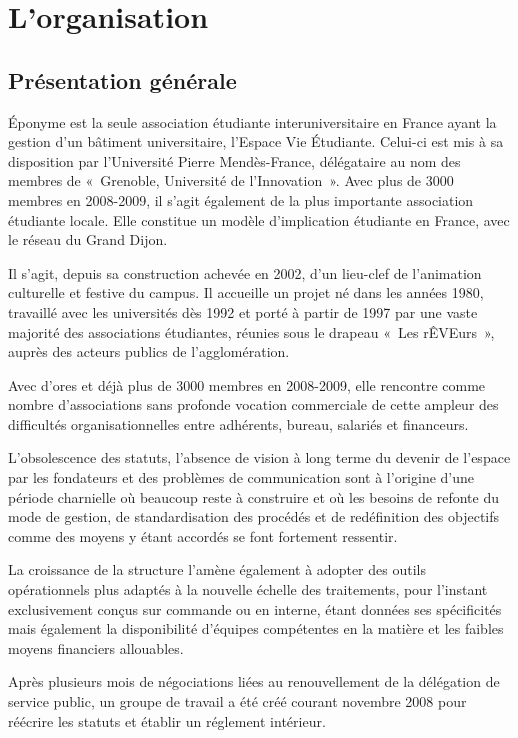 \section{L'organisation}

\subsection{Présentation générale}
\label{presentation}

Éponyme est la seule association étudiante interuniversitaire en France
ayant la gestion d'un bâtiment universitaire, l'Espace Vie Étudiante.
Celui-ci est mis à sa disposition par l'Université Pierre Mendès-France,
délégataire au nom des membres de «~Grenoble, Université de l'Innovation~».
Avec plus de 3000 membres en 2008-2009, il s'agit également de la plus
importante association étudiante locale. Elle constitue un modèle
d'implication étudiante en France, avec le réseau du Grand Dijon.

Il s'agit, depuis sa construction achevée en 2002, d'un lieu-clef de
l'animation culturelle et festive du campus. Il accueille un projet né
dans les années 1980, travaillé avec les universités dès 1992 et porté à
partir de 1997 par une vaste majorité des associations étudiantes,
réunies sous le drapeau «~Les rÊVEurs~», auprès des acteurs publics de
l'agglomération.

Avec d'ores et déjà plus de 3000 membres en 2008-2009, elle rencontre comme
nombre d'associations sans profonde vocation commerciale de cette ampleur des
difficultés organisationnelles entre adhérents, bureau, salariés et
financeurs.

L'obsolescence des statuts, l'absence de vision à long terme du devenir de l'espace
par les fondateurs et des problèmes de communication sont à l'origine d'une
période charnielle où beaucoup reste à construire et où les besoins de
refonte du mode de gestion, de standardisation des procédés et de redéfinition
des objectifs comme des moyens y étant accordés se font fortement ressentir.

La croissance de la structure l'amène également à adopter des outils
o\-pé\-ra\-tion\-nels plus adaptés à la nouvelle échelle des traitements, pour
l'instant exclusivement conçus sur commande ou en interne, étant données ses
spécificités mais également la disponibilité d'équipes compétentes en la
matière et les faibles moyens financiers allouables.

Après plusieurs mois de négociations liées au renouvellement de la délégation
de service public, un groupe de travail a été créé courant novembre
2008 pour réécrire les statuts et établir un réglement intérieur.

